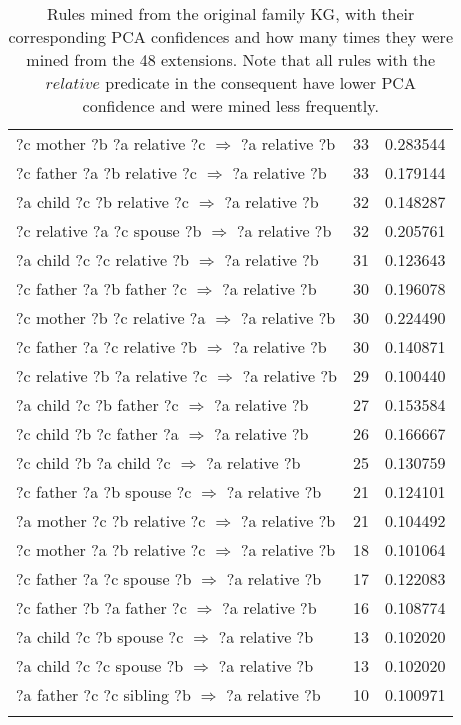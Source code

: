 \begin{longtable}{lrr}
  ?c  mother  ?b  ?a  relative  ?c   $\Rightarrow$ ?a  relative  ?b &           33 &        0.283544 \\
  ?c  father  ?a  ?b  relative  ?c   $\Rightarrow$ ?a  relative  ?b &           33 &        0.179144 \\
   ?a  child  ?c  ?b  relative  ?c   $\Rightarrow$ ?a  relative  ?b &           32 &        0.148287 \\
  ?c  relative  ?a  ?c  spouse  ?b   $\Rightarrow$ ?a  relative  ?b &           32 &        0.205761 \\
   ?a  child  ?c  ?c  relative  ?b   $\Rightarrow$ ?a  relative  ?b &           31 &        0.123643 \\
    ?c  father  ?a  ?b  father  ?c   $\Rightarrow$ ?a  relative  ?b &           30 &        0.196078 \\
  ?c  mother  ?b  ?c  relative  ?a   $\Rightarrow$ ?a  relative  ?b &           30 &        0.224490 \\
  ?c  father  ?a  ?c  relative  ?b   $\Rightarrow$ ?a  relative  ?b &           30 &        0.140871 \\
?c  relative  ?b  ?a  relative  ?c   $\Rightarrow$ ?a  relative  ?b &           29 &        0.100440 \\
     ?a  child  ?c  ?b  father  ?c   $\Rightarrow$ ?a  relative  ?b &           27 &        0.153584 \\
     ?c  child  ?b  ?c  father  ?a   $\Rightarrow$ ?a  relative  ?b &           26 &        0.166667 \\
      ?c  child  ?b  ?a  child  ?c   $\Rightarrow$ ?a  relative  ?b &           25 &        0.130759 \\
    ?c  father  ?a  ?b  spouse  ?c   $\Rightarrow$ ?a  relative  ?b &           21 &        0.124101 \\
  ?a  mother  ?c  ?b  relative  ?c   $\Rightarrow$ ?a  relative  ?b &           21 &        0.104492 \\
  ?c  mother  ?a  ?b  relative  ?c   $\Rightarrow$ ?a  relative  ?b &           18 &        0.101064 \\
    ?c  father  ?a  ?c  spouse  ?b   $\Rightarrow$ ?a  relative  ?b &           17 &        0.122083 \\
    ?c  father  ?b  ?a  father  ?c   $\Rightarrow$ ?a  relative  ?b &           16 &        0.108774 \\
     ?a  child  ?c  ?b  spouse  ?c   $\Rightarrow$ ?a  relative  ?b &           13 &        0.102020 \\
     ?a  child  ?c  ?c  spouse  ?b   $\Rightarrow$ ?a  relative  ?b &           13 &        0.102020 \\
   ?a  father  ?c  ?c  sibling  ?b   $\Rightarrow$ ?a  relative  ?b &           10 &        0.100971 \\
\bottomrule
\caption{Rules mined from the original family KG, with their corresponding PCA confidences and how many times they were mined from the 48 extensions. Note that all rules with the $relative$ predicate in the consequent have lower PCA confidence and were mined less frequently.}
\label{family_original_rules_table_frequencies}
\end{longtable}
\fi


